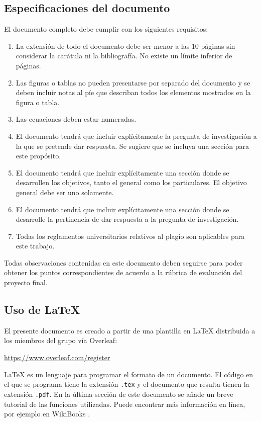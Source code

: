 \documentclass{ceri/sty/rapport}
\begin{document}
\subsection{Especificaciones del documento}
El documento completo debe cumplir con los siguientes requisitos:
\begin{enumerate}
    \item La extensión de todo el documento debe ser menor a las 10 páginas sin considerar la carátula ni la bibliografía. No existe un límite inferior de páginas. 
    \item Las figuras o tablas no pueden presentarse por separado del documento y se deben incluir notas al píe que describan todos los elementos mostrados en la figura o tabla.
    \item Las ecuaciones deben estar numeradas.
    \item El documento tendrá que incluir explícitamente la pregunta de investigación a la que se pretende dar respuesta. Se sugiere que se incluya una sección para este propósito. 
     \item El documento tendrá que incluir explícitamente una sección donde se desarrollen los objetivos, tanto el general como los particulares. El objetivo general debe ser uno solamente. 
    \item El documento tendrá que incluir explícitamente una sección donde se desarrolle la pertinencia de dar respuesta a la pregunta de investigación.
    \item Todas los reglamentos universitarios relativos al plagio son aplicables para este trabajo.
\end{enumerate}

\begin{beware}[Importante]
 Todas observaciones contenidas en este documento deben seguirse para poder obtener los puntos correspondientes de acuerdo a la rúbrica de evaluación del proyecto final.
\end{beware}
 
\subsection{Uso de \LaTeX}
El presente documento es creado a partir de una plantilla en \LaTeX{} \cite{LaTeXProject2010, Wikipedia2011a} distribuida a los miembros del grupo vía Overleaf:
\centerline{\url{https://www.overleaf.com/register}}
\LaTeX{} es un lenguaje para programar el formato de un documento. El código en el que se programa tiene la extensión \texttt{.tex} y el documento que resulta tienen la extensión \texttt{.pdf}. En la última sección de este documento se añade un breve tutorial de las funciones utilizadas. Puede encontrar más información en línea, por ejemplo en WikiBooks \cite{Wikibooks2011}.
\end{document}
